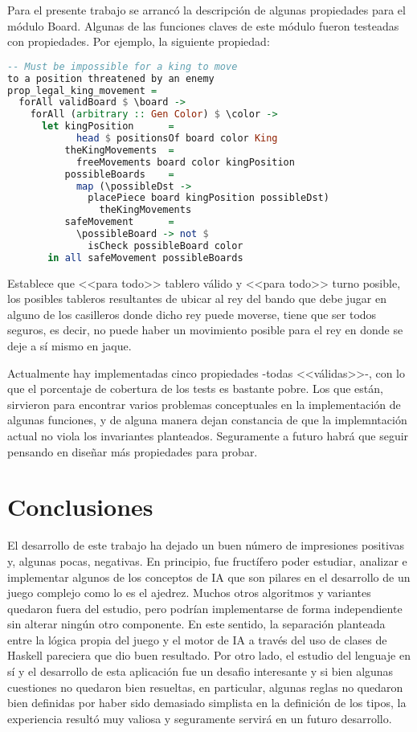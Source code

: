 \documentclass{llncs}
\begin{document}
Para el presente trabajo se arrancó la descripción de algunas propiedades para el módulo Board. Algunas de las funciones claves de este módulo fueron testeadas con propiedades. Por ejemplo, la siguiente propiedad:

\begin{lstlisting}[frame=single, language=haskell, captionpos=b, caption=Propiedad sobre los movimientos legales del rey]
-- Must be impossible for a king to move
to a position threatened by an enemy
prop_legal_king_movement =
  forAll validBoard $ \board ->
    forAll (arbitrary :: Gen Color) $ \color ->
      let kingPosition      =
            head $ positionsOf board color King
          theKingMovements  =
            freeMovements board color kingPosition
          possibleBoards    =
            map (\possibleDst ->
              placePiece board kingPosition possibleDst)
                theKingMovements
          safeMovement      =
            \possibleBoard -> not $
              isCheck possibleBoard color
       in all safeMovement possibleBoards
\end{lstlisting}

Establece que <<para todo>> tablero válido y <<para todo>> turno posible, los posibles tableros resultantes de ubicar al rey del bando que debe jugar en alguno de los casilleros donde dicho rey puede moverse, tiene que ser todos seguros, es decir, no puede haber un movimiento posible para el rey en donde se deje a sí mismo en jaque.

Actualmente hay implementadas cinco propiedades -todas <<válidas>>-, con lo que el porcentaje de cobertura de los tests es bastante pobre. Los que están, sirvieron para encontrar varios problemas conceptuales en la implementación de algunas funciones, y de alguna manera dejan constancia de que la implemntación actual no viola los invariantes planteados. Seguramente a futuro habrá que seguir pensando en diseñar más propiedades para probar.

\section{Conclusiones}

El desarrollo de este trabajo ha dejado un buen número de impresiones positivas y, algunas pocas, negativas. En principio, fue fructífero poder estudiar, analizar e implementar algunos de los conceptos de IA que son pilares en el desarrollo de un juego complejo como lo es el ajedrez. Muchos otros algoritmos y variantes quedaron fuera del estudio, pero podrían implementarse de forma independiente sin alterar ningún otro componente. En este sentido, la separación planteada entre la lógica propia del juego y el motor de IA a través del uso de clases de Haskell pareciera que dio buen resultado. Por otro lado, el estudio del lenguaje en sí y el desarrollo de esta aplicación fue un desafio interesante y si bien algunas cuestiones no quedaron bien resueltas, en particular, algunas reglas no quedaron bien definidas por haber sido demasiado simplista en la definición de los tipos, la experiencia resultó muy valiosa y seguramente servirá en un futuro desarrollo.
\end{document}

